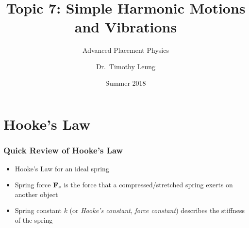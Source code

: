 \documentclass[12pt,compress,aspectratio=169]{beamer}
\title{Topic 7: Simple Harmonic Motions and Vibrations}
\subtitle{Advanced Placement Physics}
\author[TML]{Dr.\ Timothy Leung}
\institute{Olympiads School}
\date{Summer 2018}
\newcommand{\mb}[1]{\ensuremath\mathbf{#1}}
\newcommand{\eq}[2]{\vspace{#1}{\Large\begin{displaymath}#2\end{displaymath}}}
\begin{document}
\begin{frame}
  \maketitle
\end{frame}

%
%


\section{Hooke's Law}
\begin{frame}
  \frametitle{Quick Review of Hooke's Law}
  \begin{itemize}
  \item Hooke's Law for an ideal spring

    \eq{-.2in}{
      \boxed{\mb{F}_s=-k\mb{x}}
    }
  \item Spring force $\mb{F}_s$ is the force that a compressed/stretched
    spring exerts on another object
  \item Spring constant $k$ (or \emph{Hooke's constant},
    \emph{force constant}) describes the stiffness of the spring
  \end{itemize}
\end{frame}
\end{document}
